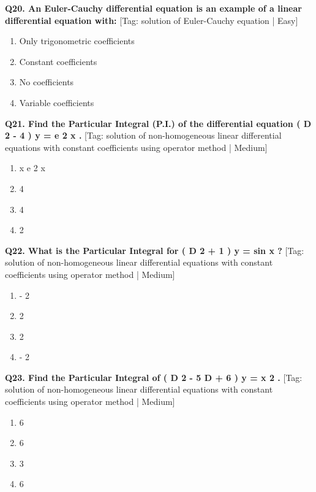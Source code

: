 \noindent\textbf{Q20. An Euler-Cauchy differential equation is an example of a linear differential equation with:} \hfill [Tag: solution of Euler-Cauchy equation | Easy]
\begin{enumerate}[label=(\alph*),topsep=2pt,itemsep=1pt,partopsep=0pt,parsep=0pt]
    \item {{Only trigonometric coefficients}}
    \item {{Constant coefficients}}
    \item {{No coefficients}}
    \item {{Variable coefficients}}
\end{enumerate}
\vspace{2mm}

\noindent\textbf{Q21. Find the Particular Integral (P.I.) of the differential equation ( D 2 - 4 ) y = e 2 x .} \hfill [Tag: solution of non-homogeneous linear differential equations with constant coefficients using operator method | Medium]
\begin{enumerate}[label=(\alph*),topsep=2pt,itemsep=1pt,partopsep=0pt,parsep=0pt]
    \item {{x e 2 x}}
    \item {{4}}
    \item {{4}}
    \item {{2}}
\end{enumerate}
\vspace{2mm}

\noindent\textbf{Q22. What is the Particular Integral for ( D 2 + 1 ) y = sin x ?} \hfill [Tag: solution of non-homogeneous linear differential equations with constant coefficients using operator method | Medium]
\begin{enumerate}[label=(\alph*),topsep=2pt,itemsep=1pt,partopsep=0pt,parsep=0pt]
    \item {{- 2}}
    \item {{2}}
    \item {{2}}
    \item {{- 2}}
\end{enumerate}
\vspace{2mm}

\noindent\textbf{Q23. Find the Particular Integral of ( D 2 - 5 D + 6 ) y = x 2 .} \hfill [Tag: solution of non-homogeneous linear differential equations with constant coefficients using operator method | Medium]
\begin{enumerate}[label=(\alph*),topsep=2pt,itemsep=1pt,partopsep=0pt,parsep=0pt]
    \item {{6}}
    \item {{6}}
    \item {{3}}
    \item {{6}}
\end{enumerate}
\vspace{2mm}

